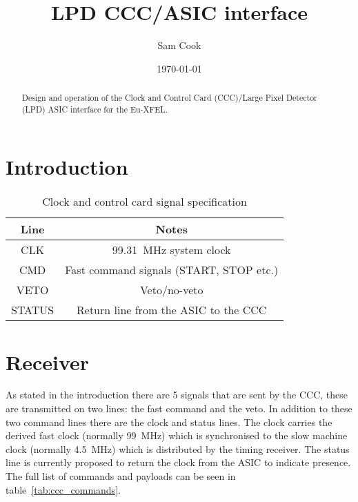\documentclass[]{article}
\title{LPD CCC/ASIC interface}
\author{ Sam Cook }
\date{\today}
\begin{document}
  \ifpdf
  \else
  \fi

  \maketitle

  \begin{abstract}
    Design and operation of the Clock and Control Card (CCC)/Large Pixel Detector (LPD) ASIC interface for the Eu-XFEL. 
  \end{abstract}
  \section{Introduction} %
  \label{sec:introduction}
  
  \begin{table}
    \begin{center}
      \begin{tabular}{c|c}
        Line & Notes \\
        \hline
        CLK    & 99.31~MHz system clock \\
        CMD    & Fast command signals (START, STOP etc.) \\
        VETO   & Veto/no-veto \\
        STATUS & Return line from the ASIC to the CCC \\
      \end{tabular}
    \end{center}
    \caption{Clock and control card signal specification}
    \label{tab:ccc_spec}
  \end{table}

  \section{Receiver} %
  \label{sec:receiver}
  As stated in the introduction there are 5 signals that are sent by the CCC, these are transmitted on two lines: the fast command and the veto. In addition to these two command lines there are the clock and status lines. The clock carries the derived fast clock (normally 99~MHz) which is synchronised to the slow machine clock (normally 4.5~MHz) which is distributed by the timing receiver. The status line is currently proposed to return the clock from the ASIC to indicate presence. The full list of commands and payloads can be seen in table~\ref{tab:ccc_commands}.
  
\end{document}
